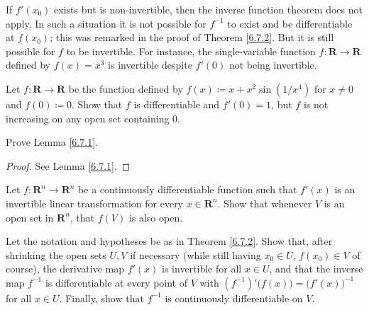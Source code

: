 \begin{note}
    If \(f'(x_0)\) exists but is non-invertible, then the inverse function theorem does not apply.
    In such a situation it is not possible for \(f^{-1}\) to exist and be differentiable at \(f(x_0)\);
    this was remarked in the proof of Theorem \ref{6.7.2}.
    But it is still possible for \(f\) to be invertible.
    For instance, the single-variable function \(f : \mathbf{R} \to \mathbf{R}\) defined by \(f(x) = x^3\) is invertible despite \(f'(0)\) not being invertible.
\end{note}

\exercisesection

\begin{exercise}\label{ex 6.7.1}
    Let \(f : \mathbf{R} \to \mathbf{R}\) be the function defined by \(f(x) \coloneqq x + x^2 \sin(1 / x^4)\) for \(x \neq 0\) and \(f(0) \coloneqq 0\).
    Show that \(f\) is differentiable and \(f'(0) = 1\), but \(f\) is not increasing on any open set containing \(0\).
\end{exercise}

\begin{exercise}\label{ex 6.7.2}
    Prove Lemma \ref{6.7.1}.
\end{exercise}

\begin{proof}
    See Lemma \ref{6.7.1}.
\end{proof}

\begin{exercise}\label{ex 6.7.3}
    Let \(f : \mathbf{R}^n \to \mathbf{R}^n\) be a continuously differentiable function such that \(f'(x)\) is an invertible linear transformation for every \(x \in \mathbf{R}^n\).
    Show that whenever \(V\) is an open set in \(\mathbf{R}^n\), that \(f(V)\) is also open.
\end{exercise}

\begin{exercise}\label{ex 6.7.4}
    Let the notation and hypotheses be as in Theorem \ref{6.7.2}.
    Show that, after shrinking the open sets \(U, V\) if necessary (while still having \(x_0 \in U\), \(f(x_0) \in V\) of course), the derivative map \(f'(x)\) is invertible for all \(x \in U\), and that the inverse map \(f^{-1}\) is differentiable at every point of \(V\) with \((f^{-1})' \big(f(x)\big) = \big(f'(x)\big)^{-1}\) for all \(x \in U\).
    Finally, show that \(f^{-1}\) is continuously differentiable on \(V\).
\end{exercise}